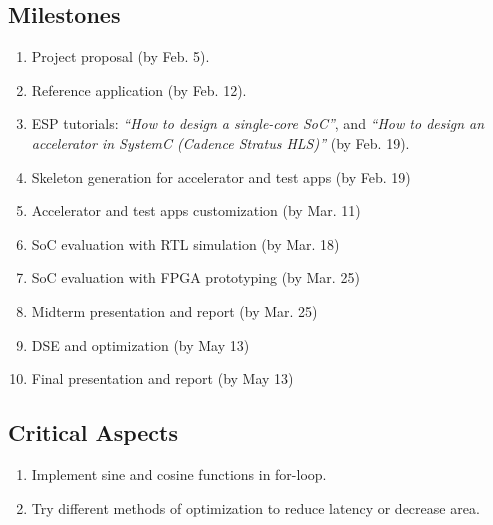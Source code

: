 \subsection{Milestones}\label{sec:arch}
\label{sec:milestones}


\begin{enumerate}

\item Project proposal (by Feb. 5).

\item Reference application (by Feb. 12).

\item ESP tutorials: \emph{``How to design a single-core SoC''}, and 
  \emph{``How to design an accelerator in SystemC (Cadence Stratus HLS)''} (by Feb. 19).

\item Skeleton generation for accelerator and test apps (by Feb. 19)

\item Accelerator and test apps customization (by Mar. 11)

\item SoC evaluation with RTL simulation (by Mar. 18)

\item SoC evaluation with FPGA prototyping (by Mar. 25)

\item Midterm presentation and report (by Mar. 25)

\item DSE and optimization (by May 13)

\item Final presentation and report (by May 13)

\end{enumerate}


\subsection{Critical Aspects}
\begin{enumerate}

\item Implement sine and cosine functions in for-loop.

\item Try different methods of optimization to reduce latency or decrease area.

\end{enumerate}
